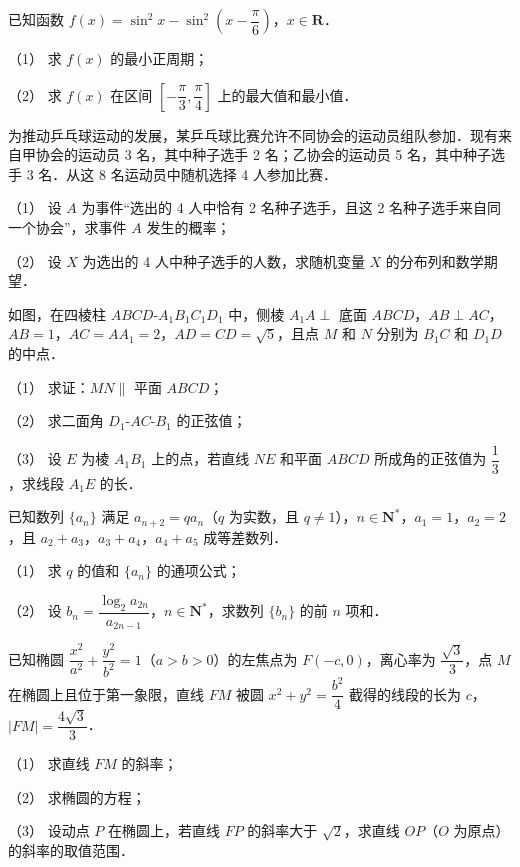 \begin{question}
已知函数 \(f(x)=\sin^2 x-\sin^2\left(x-\dfrac{\pi}{6}\right)\)，\(x\in\mathbf{R}\)．

（1） 求 \(f(x)\) 的最小正周期；

（2） 求 \(f(x)\) 在区间 \(\left[-\dfrac{\pi}{3},\dfrac{\pi}{4}\right]\) 上的最大值和最小值．

\end{question}
\begin{question}
为推动乒乓球运动的发展，某乒乓球比赛允许不同协会的运动员组队参加．现有来自甲协会的运动员 3 名，其中种子选手 2 名；乙协会的运动员 5 名，其中种子选手 3 名．从这 8 名运动员中随机选择 4 人参加比赛．

（1） 设 \(A\) 为事件“选出的 4 人中恰有 2 名种子选手，且这 2 名种子选手来自同一个协会”，求事件 \(A\) 发生的概率；

（2） 设 \(X\) 为选出的 4 人中种子选手的人数，求随机变量 \(X\) 的分布列和数学期望．

\Needspace{0.4\textheight}
\end{question}
\begin{question}
如图，在四棱柱 \(ABCD\text{-}A_1B_1C_1D_1\) 中，侧棱 \(A_1A\perp\) 底面 \(ABCD\)，\(AB\perp AC\)，\(AB=1\)，\(AC=AA_1=2\)，\(AD=CD=\sqrt{5}\)，且点 \(M\) 和 \(N\) 分别为 \(B_1C\) 和 \(D_1D\) 的中点．
\nopagebreak[4]
\begin{center}\end{center}
\nopagebreak[4]
（1） 求证：\(MN\parallel\) 平面 \(ABCD\)；

（2） 求二面角 \(D_1\text{-}AC\text{-}B_1\) 的正弦值；

（3） 设 \(E\) 为棱 \(A_1B_1\) 上的点，若直线 \(NE\) 和平面 \(ABCD\) 所成角的正弦值为 \(\dfrac{1}{3}\)，求线段 \(A_1E\) 的长．

\end{question}
\begin{question}
已知数列 \(\{a_n\}\) 满足 \(a_{n+2}=qa_n\)（\(q\) 为实数，且 \(q\neq1\)），\(n\in\mathbf{N}^{*}\)，\(a_1=1\)，\(a_2=2\)，且 \(a_2+a_3\)，\(a_3+a_4\)，\(a_4+a_5\) 成等差数列．

（1） 求 \(q\) 的值和 \(\{a_n\}\) 的通项公式；

（2） 设 \(b_n=\dfrac{\log_2 a_{2n}}{a_{2n-1}}\)，\(n\in\mathbf{N}^{*}\)，求数列 \(\{b_n\}\) 的前 \(n\) 项和．

\end{question}
\begin{question}
已知椭圆 \(\dfrac{x^2}{a^2}+\dfrac{y^2}{b^2}=1\)（\(a>b>0\)）的左焦点为 \(F(-c,0)\)，离心率为 \(\dfrac{\sqrt{3}}{3}\)，点 \(M\) 在椭圆上且位于第一象限，直线 \(FM\) 被圆 \(x^2+y^2=\dfrac{b^2}{4}\) 截得的线段的长为 \(c\)，\(|FM|=\dfrac{4\sqrt{3}}{3}\)．

（1） 求直线 \(FM\) 的斜率；

（2） 求椭圆的方程；

（3） 设动点 \(P\) 在椭圆上，若直线 \(FP\) 的斜率大于 \(\sqrt{2}\)，求直线 \(OP\)（\(O\) 为原点）的斜率的取值范围．

\end{question}
